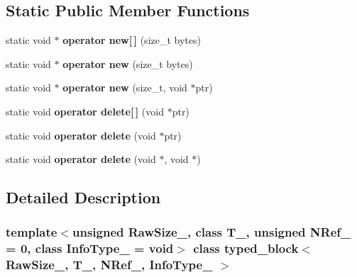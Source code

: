 \subsection*{Static Public Member Functions}
\begin{CompactItemize}
\item 
\hypertarget{group__mnglayer_gfb2c22d3b5ab3c33b98bc3fd71b4b940}{
static void $\ast$ \textbf{operator new\mbox{[}$\,$\mbox{]}} (size\_\-t bytes)}
\label{group__mnglayer_gfb2c22d3b5ab3c33b98bc3fd71b4b940}

\item 
\hypertarget{group__mnglayer_gf322e446d29d36fe3e8687bff69bbd21}{
static void $\ast$ \textbf{operator new} (size\_\-t bytes)}
\label{group__mnglayer_gf322e446d29d36fe3e8687bff69bbd21}

\item 
\hypertarget{group__mnglayer_g46a01a83f3954057c367a23a1e4f0e02}{
static void $\ast$ \textbf{operator new} (size\_\-t, void $\ast$ptr)}
\label{group__mnglayer_g46a01a83f3954057c367a23a1e4f0e02}

\item 
\hypertarget{group__mnglayer_g8c64f56092ff568bad31293b1ccdab53}{
static void \textbf{operator delete\mbox{[}$\,$\mbox{]}} (void $\ast$ptr)}
\label{group__mnglayer_g8c64f56092ff568bad31293b1ccdab53}

\item 
\hypertarget{group__mnglayer_g6c881aecb0a7b2e3c306c3d47e846140}{
static void \textbf{operator delete} (void $\ast$ptr)}
\label{group__mnglayer_g6c881aecb0a7b2e3c306c3d47e846140}

\item 
\hypertarget{group__mnglayer_gcaec0a5f3e2d6ff44e1d7fa30ff602b5}{
static void \textbf{operator delete} (void $\ast$, void $\ast$)}
\label{group__mnglayer_gcaec0a5f3e2d6ff44e1d7fa30ff602b5}

\end{CompactItemize}


\subsection{Detailed Description}
\subsubsection*{template$<$unsigned RawSize\_\-, class T\_\-, unsigned NRef\_\- = 0, class InfoType\_\- = void$>$ class typed\_\-block$<$ RawSize\_\-, T\_\-, NRef\_\-, InfoType\_\- $>$}

